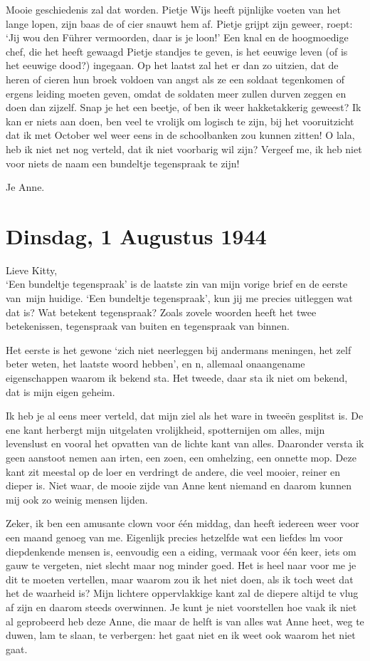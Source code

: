 \documentclass{book}
\begin{document}
Mooie geschiedenis zal dat worden. Pietje Wijs heeft pijnlijke voeten
van het lange lopen, zijn baas de of cier snauwt hem af. Pietje grijpt
zijn geweer, roept: `Jij wou den Führer vermoorden, daar is je loon!'
Een knal en de hoogmoedige chef, die het heeft gewaagd Pietje standjes
te geven, is het eeuwige leven (of is het eeuwige dood?) ingegaan. Op
het laatst zal het er dan zo uitzien, dat de heren of cieren hun broek
voldoen van angst als ze een soldaat tegenkomen of ergens leiding moeten
geven, omdat de soldaten meer zullen durven zeggen en doen dan zijzelf.
Snap je het een beetje, of ben ik weer hakketakkerig geweest? Ik kan er
niets aan doen, ben veel te vrolijk om logisch te zijn, bij het
vooruitzicht dat ik met October wel weer eens in de schoolbanken zou
kunnen zitten! O lala, heb ik niet net nog verteld, dat ik niet
voorbarig wil zijn? Vergeef me, ik heb niet voor niets de naam een
bundeltje tegenspraak te zijn!

Je Anne.

\chapter{Dinsdag, 1 Augustus 1944}

Lieve Kitty,\\`Een bundeltje tegenspraak' is de laatste zin van mijn
vorige brief en de eerste van~mijn huidige. `Een bundeltje tegenspraak',
kun jij me precies uitleggen wat dat is? Wat betekent tegenspraak? Zoals
zovele woorden heeft het twee betekenissen, tegenspraak van buiten en
tegenspraak van binnen.

Het eerste is het gewone `zich niet neerleggen bij andermans meningen,
het zelf beter weten, het laatste woord hebben', en n, allemaal
onaangename eigenschappen waarom ik bekend sta. Het tweede, daar sta ik
niet om bekend, dat is mijn eigen geheim.

Ik heb je al eens meer verteld, dat mijn ziel als het ware in tweeën
gesplitst is. De ene kant herbergt mijn uitgelaten vrolijkheid,
spotternijen om alles, mijn levenslust en vooral het opvatten van de
lichte kant van alles. Daaronder versta ik geen aanstoot nemen aan
irten, een zoen, een omhelzing, een onnette mop. Deze kant zit meestal
op de loer en verdringt de andere, die veel mooier, reiner en dieper is.
Niet waar, de mooie zijde van Anne kent niemand en daarom kunnen mij ook
zo weinig mensen lijden.

Zeker, ik ben een amusante clown voor één middag, dan heeft iedereen
weer voor een maand genoeg van me. Eigenlijk precies hetzelfde wat een
liefdes lm voor diepdenkende mensen is, eenvoudig een a eiding, vermaak
voor één keer, iets om gauw te vergeten, niet slecht maar nog minder
goed. Het is heel naar voor me je dit te moeten vertellen, maar waarom
zou ik het niet doen, als ik toch weet dat het de waarheid is? Mijn
lichtere oppervlakkige kant zal de diepere altijd te vlug af zijn en
daarom steeds overwinnen. Je kunt je niet voorstellen hoe vaak ik niet
al geprobeerd heb deze Anne, die maar de helft is van alles wat Anne
heet, weg te duwen, lam te slaan, te verbergen: het gaat niet en ik weet
ook waarom het niet gaat.
\end{document}
